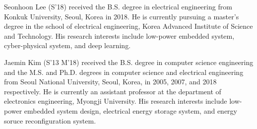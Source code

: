 \documentclass[journal]{./template/IEEEtran}
\begin{document}
\begin{IEEEbiography}{Seonhoon Lee}
(S'18) received the B.S. degree in electrical engineering from Konkuk University, Seoul, Korea in 2018. He is currently pursuing a master’s degree in the school of electrical engineering, Korea Advanced Institute of Science and Technology. His research interests include low-power embedded system, cyber-physical system, and deep learning.
\end{IEEEbiography}

\begin{IEEEbiography}{Jaemin Kim}
(S'13 M'18) received the B.S. degree in computer science engineering and the M.S. and Ph.D. degrees in computer science and electrical engineering from Seoul National University, Seoul, Korea, in 2005, 2007, and 2018 respectively. He is currently an assistant professor at the department of electronics engineering, Myongji University. His research interests include low-power embedded system design, electrical energy storage system, and energy soruce reconfiguration system.
\end{IEEEbiography}
\end{document}
